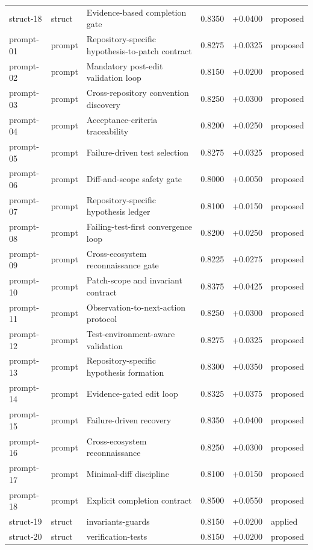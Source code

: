 \begin{center}
\begin{longtable}{llp{5.2cm}rrl}
struct-18 & struct & Evidence-based completion gate & 0.8350 & +0.0400 & proposed \\
prompt-01 & prompt & Repository-specific hypothesis-to-patch contract & 0.8275 & +0.0325 & proposed \\
prompt-02 & prompt & Mandatory post-edit validation loop & 0.8150 & +0.0200 & proposed \\
prompt-03 & prompt & Cross-repository convention discovery & 0.8250 & +0.0300 & proposed \\
prompt-04 & prompt & Acceptance-criteria traceability & 0.8200 & +0.0250 & proposed \\
prompt-05 & prompt & Failure-driven test selection & 0.8275 & +0.0325 & proposed \\
prompt-06 & prompt & Diff-and-scope safety gate & 0.8000 & +0.0050 & proposed \\
prompt-07 & prompt & Repository-specific hypothesis ledger & 0.8100 & +0.0150 & proposed \\
prompt-08 & prompt & Failing-test-first convergence loop & 0.8200 & +0.0250 & proposed \\
prompt-09 & prompt & Cross-ecosystem reconnaissance gate & 0.8225 & +0.0275 & proposed \\
prompt-10 & prompt & Patch-scope and invariant contract & 0.8375 & +0.0425 & proposed \\
prompt-11 & prompt & Observation-to-next-action protocol & 0.8250 & +0.0300 & proposed \\
prompt-12 & prompt & Test-environment-aware validation & 0.8275 & +0.0325 & proposed \\
prompt-13 & prompt & Repository-specific hypothesis formation & 0.8300 & +0.0350 & proposed \\
prompt-14 & prompt & Evidence-gated edit loop & 0.8325 & +0.0375 & proposed \\
prompt-15 & prompt & Failure-driven recovery & 0.8350 & +0.0400 & proposed \\
prompt-16 & prompt & Cross-ecosystem reconnaissance & 0.8250 & +0.0300 & proposed \\
prompt-17 & prompt & Minimal-diff discipline & 0.8100 & +0.0150 & proposed \\
prompt-18 & prompt & Explicit completion contract & 0.8500 & +0.0550 & proposed \\
struct-19 & struct & invariants-guards & 0.8150 & +0.0200 & applied \\
struct-20 & struct & verification-tests & 0.8150 & +0.0200 & proposed \\

\end{longtable}
\end{center}
